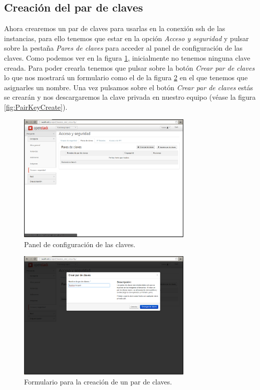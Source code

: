 \documentclass{article}
\begin{document}
\clearpage
\subsection{Creación del par de claves}
	Ahora crearemos un par de claves para usarlas en la conexión ssh de las instancias, para ello tenemos que estar en la opción \emph{Acceso y seguridad} y pulsar sobre la pestaña \emph{Pares de claves} para acceder al panel de configuración de las claves. Como podemos ver en la figura \ref{fig:PairKeyInit}, inicialmente no tenemos ninguna clave creada. Para poder crearla tenemos que pulsar sobre la botón \emph{Crear par de claves} lo que nos mostrará un formulario como el de la figura \ref{fig:PairKeyFormCreate} en el que tenemos que asignarles un nombre. Una vez pulsamos sobre el botón \emph{Crear par de claves} estás se crearán y nos descargaremos la clave privada en nuestro equipo (véase la figura  \ref{fig:PairKeyCreate}).

\begin{figure}[h]
  \centering
    \includegraphics[width=0.75\textwidth]{img/m_034.png}
  \caption{Panel de configuración de las claves.}
  \label{fig:PairKeyInit}
\end{figure}	

\begin{figure}[h]
  \centering
    \includegraphics[width=0.75\textwidth]{img/m_035.png}
  \caption{Formulario para la creación de un par de claves.}
  \label{fig:PairKeyFormCreate}
\end{figure}	
\end{document}
